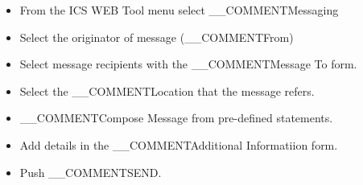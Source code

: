 \begin{itemize}
\item From the ICS WEB Tool menu select __COMMENT{Messaging} 
\item Select the originator of message (__COMMENT{From}) 
\item Select message recipients with the __COMMENT{Message To} form.
\item Select the __COMMENT{Location} that the message refers.
\item __COMMENT{Compose Message} from pre-defined statements. 
\item Add details in the __COMMENT{Additional Informatiion} form.
\item Push __COMMENT{SEND}.
\end{itemize}
